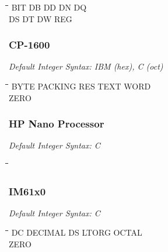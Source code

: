 {\tt\begin{tabbing}
\hspace{3cm}\=\hspace{3cm}\=\hspace{3cm}\=\hspace{3cm}\=\kill
BIT        \> DB          \> DD          \> DN          \> DQ \\
DS         \> DT          \> DW          \> REG \\
\end{tabbing}}

\subsubsection{CP-1600}

{\em Default Integer Syntax: IBM (hex), C (oct) }

{\tt\begin{tabbing}
\hspace{3cm}\=\hspace{3cm}\=\hspace{3cm}\=\hspace{3cm}\=\kill
BYTE       \> PACKING     \> RES         \> TEXT        \> WORD \\
ZERO \\
\end{tabbing}}

\subsubsection{HP Nano Processor}

{\em Default Integer Syntax: C }

{\tt\begin{tabbing}
\hspace{3cm}\=\hspace{3cm}\=\hspace{3cm}\=\hspace{3cm}\=\kill
\end{tabbing}}

\subsubsection{IM61x0}

{\em Default Integer Syntax: C }

{\tt\begin{tabbing}
\hspace{3cm}\=\hspace{3cm}\=\hspace{3cm}\=\hspace{3cm}\=\kill
DC         \> DECIMAL     \> DS          \> LTORG       \> OCTAL \\
ZERO \\
\end{tabbing}}

